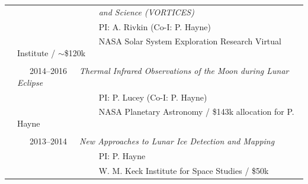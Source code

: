 \documentclass[letterpaper,10pt,twoside]{article}
\begin{document}
\begin{tabular}{@{} l l}
 & ~~~~~~~~~~~~~~~~ ~~~\textit{and Science (VORTICES)}\\
 & ~~~~~~~~~~~~~~~~ ~~~PI: A. Rivkin (Co-I: P. Hayne) \\
 & ~~~~~~~~~~~~~~~~ ~~~NASA Solar System Exploration Research Virtual Institute / $\sim$\$120k\\
 & \\
 & ~~~2014--2016~~~\textit{Thermal Infrared Observations of the Moon during Lunar Eclipse} \\
 & ~~~~~~~~~~~~~~~~ ~~~PI: P. Lucey (Co-I: P. Hayne) \\
 & ~~~~~~~~~~~~~~~~ ~~~NASA Planetary Astronomy / \$143k allocation for P. Hayne \\
 & \\
 & ~~~2013--2014~~~\textit{New Approaches to Lunar Ice Detection and Mapping} \\
 & ~~~~~~~~~~~~~~~~ ~~~PI: P. Hayne \\
 & ~~~~~~~~~~~~~~~~ ~~~W. M. Keck Institute for Space Studies / \$50k \\
\end{tabular}

\vspace{0.05in}
\end{document}
